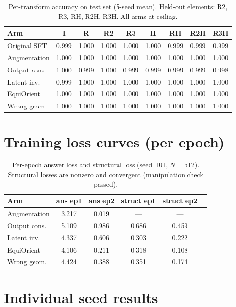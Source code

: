 \documentclass[10pt,letterpaper]{article}
\begin{document}
\begin{table}[h]
\centering\small
\begin{tabular}{lcccccccc}
\toprule
Arm & I & R & R2 & R3 & H & RH & R2H & R3H \\
\midrule
Original SFT & 0.999 & 1.000 & 1.000 & 1.000 & 1.000 & 0.999 & 0.999 & 0.999 \\
Augmentation & 1.000 & 1.000 & 1.000 & 1.000 & 1.000 & 1.000 & 1.000 & 1.000 \\
Output cons. & 1.000 & 0.999 & 1.000 & 0.999 & 0.999 & 0.999 & 0.999 & 0.998 \\
Latent inv. & 0.999 & 1.000 & 1.000 & 1.000 & 1.000 & 1.000 & 1.000 & 1.000 \\
EquiOrient & 1.000 & 1.000 & 1.000 & 1.000 & 1.000 & 1.000 & 1.000 & 1.000 \\
Wrong geom. & 1.000 & 1.000 & 1.000 & 1.000 & 1.000 & 1.000 & 1.000 & 1.000 \\
\bottomrule
\end{tabular}
\caption{Per-transform accuracy on test set (5-seed mean). Held-out
elements: R2, R3, RH, R2H, R3H. All arms at ceiling.}
\end{table}

\section{Training loss curves (per epoch)}

\begin{table}[h]
\centering\small
\begin{tabular}{lccccc}
\toprule
Arm & ans ep1 & ans ep2 & struct ep1 & struct ep2 \\
\midrule
Augmentation & 3.217 & 0.019 & --- & --- \\
Output cons. & 5.109 & 0.986 & 0.686 & 0.459 \\
Latent inv. & 4.337 & 0.606 & 0.303 & 0.222 \\
EquiOrient & 4.106 & 0.211 & 0.318 & 0.108 \\
Wrong geom. & 4.424 & 0.388 & 0.351 & 0.174 \\
\bottomrule
\end{tabular}
\caption{Per-epoch answer loss and structural loss (seed~101, $N{=}512$).
Structural losses are nonzero and convergent (manipulation check passed).}
\end{table}

\section{Individual seed results}
\end{document}
